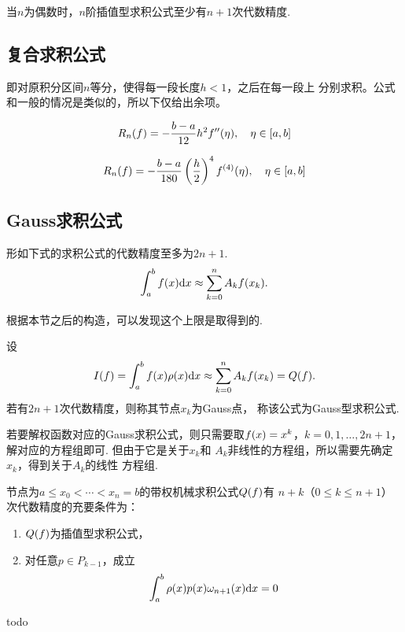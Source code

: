   \begin{thm}[偶阶求积公式的代数精度]
    当$n$为偶数时，$n$阶插值型求积公式至少有$n+1$次代数精度.
  \end{thm}

\subsection{复合求积公式}
  即对原积分区间$n$等分，使得每一段长度$h<1$，之后在每一段上
  分别求积。公式和一般的情况是类似的，所以下仅给出余项。

  \begin{thm}[复合梯形公式余项]
    \[
      R_n(\mathnormal{f}) = -\frac{b-a}{12}h^2\mathnormal{f}^{\prime\prime}(\eta),\quad
      \eta\in[a, b]
    \]
  \end{thm}

  \begin{thm}[复合Simpson公式]
    \[
      R_n(\mathnormal{f}) = -\frac{b-a}{180}\left(\frac{h}{2}\right)^4\mathnormal{f}^{(4)}(\eta),
      \quad\eta\in[a, b]
    \]
  \end{thm}

\subsection{Gauss求积公式}
  \begin{pos}[求积公式代数精度上限]
    形如下式的求积公式的代数精度至多为$2n+1$.
    \[
      \int_a^b\mathnormal{f}(x)\mathrm{d} x\approx \sum_{k=0}^nA_k\mathnormal{f}(x_k).
    \]
  \end{pos}
  \remark
    根据本节之后的构造，可以发现这个上限是取得到的.

  \begin{defi}[Gauss求积公式]
    设
    \begin{equation}
      \label{equ: 带权求积公式}
      I(\mathnormal{f}) = \int_a^b\mathnormal{f}(x)\rho(x)\mathrm{d} x \approx \sum_{k=0}^nA_k\mathnormal{f}(x_k) = Q(\mathnormal{f}).
    \end{equation}
    若有$2n+1$次代数精度，则称其节点$x_k$为Gauss点，
    称该公式为Gauss型求积公式.
  \end{defi}
  \remark
    若要解权函数对应的Gauss求积公式，则只需要取$\mathnormal{f}(x) = x^k$，$k=
    0,1,\dots, 2n+1$，解对应的方程组即可. 但由于它是关于$x_k$和
    $A_k$非线性的方程组，所以需要先确定$x_k$，得到关于$A_k$的线性
    方程组.

  \begin{thm}
    节点为$a \le x_0 < \cdots < x_n = b$的带权机械求积公式$Q(\mathnormal{f})$有
    $n+k$（$0\le k\le n+1$）次代数精度的充要条件为：
    \begin{enumerate}
      \item $Q(\mathnormal{f})$为插值型求积公式，
      \item 对任意$p\in P_{k-1}$，成立
      \[
        \int_a^b\rho(x)p(x)\omega_{n+1}(x)\mathrm{d} x = 0
      \]
    \end{enumerate}
  \end{thm}
  \proof
    todo

